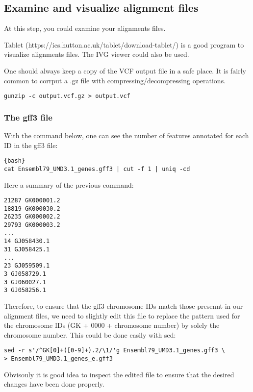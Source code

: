 \subsection{Examine and visualize alignment files}

At this step, you could examine your alignments files.

Tablet (https://ics.hutton.ac.uk/tablet/download-tablet/) is a good program to visualize alignments files. The IVG viewer could also be used.


One should always keep a copy of the VCF output file in a safe place. It is fairly common to corrput a .gz file with compressing/decompressing operations.




\begin{verbatim}
gunzip -c output.vcf.gz > output.vcf
\end{verbatim}





\subsubsection{The gff3 file}

With the command below, one can see the number of features annotated for each ID in the gff3 file: 

\begin{verbatim}{bash}
cat Ensembl79_UMD3.1_genes.gff3 | cut -f 1 | uniq -cd
\end{verbatim}


Here a summary of the previous command:
\begin{verbatim}
21287 GK000001.2
18819 GK000030.2
26235 GK000002.2
29793 GK000003.2
...
14 GJ058430.1
31 GJ058425.1
...
23 GJ059509.1
3 GJ058729.1
3 GJ060027.1
3 GJ058256.1
\end{verbatim}

Therefore, to ensure that the gff3 chromosome IDs match those presennt in our alignment files, we need to slightly edit this file to replace the pattern used for the chromosome IDs (GK + 0000 + chromosome number) by solely the chromosome number. This could be done easily with sed:

\begin{verbatim}
sed -r s'/^GK[0]+([0-9]+).2/\1/'g Ensembl79_UMD3.1_genes.gff3 \
> Ensembl79_UMD3.1_genes_e.gff3
\end{verbatim}

Obvisouly it is good idea to inspect the edited file to ensure that the desired changes have been done properly.




